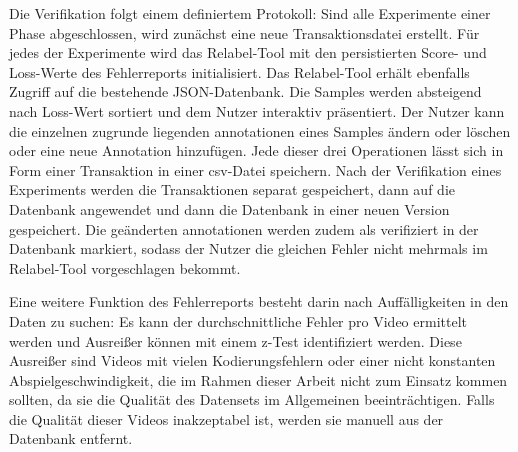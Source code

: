 Die Verifikation folgt einem definiertem Protokoll:
Sind alle Experimente einer Phase abgeschlossen, wird zunächst eine neue Transaktionsdatei erstellt.
Für jedes der Experimente wird das Relabel-Tool mit den persistierten Score- und Loss-Werte des Fehlerreports initialisiert.
Das Relabel-Tool erhält ebenfalls Zugriff auf die bestehende JSON-Datenbank.
Die Samples werden absteigend nach Loss-Wert sortiert und dem Nutzer interaktiv präsentiert.
Der Nutzer kann die einzelnen zugrunde liegenden \gls{annotationen} eines Samples ändern oder löschen oder eine neue Annotation hinzufügen.
Jede dieser drei Operationen lässt sich in Form einer Transaktion in einer \gls{csv}-Datei speichern.
Nach der Verifikation eines Experiments werden die Transaktionen separat gespeichert, dann auf die Datenbank angewendet und dann die Datenbank in einer neuen Version gespeichert.
Die geänderten \gls{annotationen} werden zudem als verifiziert in der Datenbank markiert, sodass der Nutzer die gleichen Fehler nicht mehrmals im Relabel-Tool vorgeschlagen bekommt.

Eine weitere Funktion des Fehlerreports besteht darin nach Auffälligkeiten in den Daten zu suchen:
Es kann der durchschnittliche Fehler pro Video ermittelt werden und Ausreißer können mit einem z-Test identifiziert werden.
Diese Ausreißer sind \zB Videos mit vielen Kodierungsfehlern oder einer nicht konstanten Abspielgeschwindigkeit, die im Rahmen dieser Arbeit nicht zum Einsatz kommen sollten, da sie die Qualität des Datensets im Allgemeinen beeinträchtigen.
Falls die Qualität dieser Videos inakzeptabel ist, werden sie manuell aus der Datenbank entfernt.
